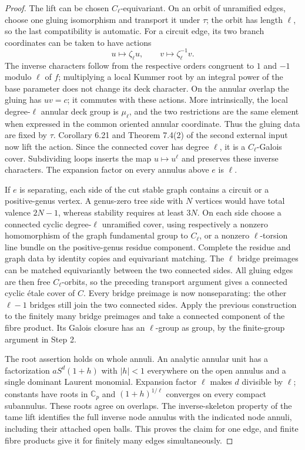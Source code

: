 \begin{proof}
The lift can be chosen $C_\ell$-equivariant.  On an orbit of
unramified edges, choose one gluing isomorphism and transport it
under $\tau$; the orbit has length $\ell$, so the last compatibility
is automatic.  For a circuit edge, its two branch coordinates can
be taken to have actions
\[
              u\longmapsto\zeta_\ell u,
       \qquad v\longmapsto\zeta_\ell^{-1}v.
\]
The inverse characters follow from the respective orders congruent
to $1$ and $-1$ modulo $\ell$ of $f$; multiplying a local Kummer
root by an integral power of the base parameter does not change
its deck character.  On the annular overlap the gluing has $uv=c$;
it commutes with these actions.  More intrinsically, the local
degree-$\ell$ annular deck group is $\mu_\ell$, and the two
restrictions are the same element when expressed in the common
oriented annular coordinate.  Thus the gluing data are fixed by
$\tau$.  Corollary 6.21 and Theorem 7.4(2) of the second external
input now lift the action.  Since the connected cover has degree
$\ell$, it is a $C_\ell$-Galois cover.  Subdividing loops inserts
the map $u\mapsto u^\ell$ and preserves these inverse characters.
The expansion factor on every annulus above $e$ is $\ell$.

If $e$ is separating, each side of the cut stable graph contains
a circuit or a positive-genus vertex.  A genus-zero tree side with
$N$ vertices would have total valence $2N-1$, whereas stability
requires at least $3N$.  On each side choose a connected cyclic
degree-$\ell$ unramified cover, using respectively a nonzero
homomorphism of the graph fundamental group to $C_\ell$, or a
nonzero $\ell$-torsion line bundle on the positive-genus residue
component.  Complete the residue and graph data by identity copies
and equivariant matching.  The $\ell$ bridge preimages can be
matched equivariantly between the two connected sides.  All gluing
edges are then free $C_\ell$-orbits, so the preceding transport
argument gives a connected cyclic \'etale cover of $C$.
Every bridge preimage is now nonseparating: the other $\ell-1$
bridges still join the two connected sides.  Apply the previous
construction to the finitely many bridge preimages and take a
connected component of the fibre product.  Its Galois closure has
an $\ell$-group as group, by the finite-group argument in Step 2.

The root assertion holds on whole annuli.  An analytic annular unit
has a factorization $aS^d(1+h)$ with $|h|<1$ everywhere on the open
annulus and a single dominant Laurent monomial.  Expansion factor
$\ell$ makes $d$ divisible by $\ell$; constants have roots in
$\mathbb C_p$ and $(1+h)^{1/\ell}$ converges on every compact
subannulus.  These roots agree on overlaps.  The inverse-skeleton
property of the tame lift identifies the full inverse node annulus
with the indicated node annuli, including their attached open
balls.  This proves the claim for one edge, and finite fibre
products give it for finitely many edges simultaneously.


\end{proof}
